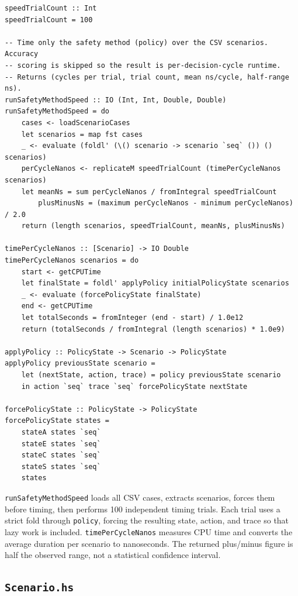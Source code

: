 \documentclass[11pt]{article}
\begin{document}
\begin{lstlisting}
speedTrialCount :: Int
speedTrialCount = 100

-- Time only the safety method (policy) over the CSV scenarios. Accuracy
-- scoring is skipped so the result is per-decision-cycle runtime.
-- Returns (cycles per trial, trial count, mean ns/cycle, half-range ns).
runSafetyMethodSpeed :: IO (Int, Int, Double, Double)
runSafetyMethodSpeed = do
    cases <- loadScenarioCases
    let scenarios = map fst cases
    _ <- evaluate (foldl' (\() scenario -> scenario `seq` ()) () scenarios)
    perCycleNanos <- replicateM speedTrialCount (timePerCycleNanos scenarios)
    let meanNs = sum perCycleNanos / fromIntegral speedTrialCount
        plusMinusNs = (maximum perCycleNanos - minimum perCycleNanos) / 2.0
    return (length scenarios, speedTrialCount, meanNs, plusMinusNs)

timePerCycleNanos :: [Scenario] -> IO Double
timePerCycleNanos scenarios = do
    start <- getCPUTime
    let finalState = foldl' applyPolicy initialPolicyState scenarios
    _ <- evaluate (forcePolicyState finalState)
    end <- getCPUTime
    let totalSeconds = fromInteger (end - start) / 1.0e12
    return (totalSeconds / fromIntegral (length scenarios) * 1.0e9)

applyPolicy :: PolicyState -> Scenario -> PolicyState
applyPolicy previousState scenario =
    let (nextState, action, trace) = policy previousState scenario
    in action `seq` trace `seq` forcePolicyState nextState

forcePolicyState :: PolicyState -> PolicyState
forcePolicyState states =
    stateA states `seq`
    stateE states `seq`
    stateC states `seq`
    stateS states `seq`
    states
\end{lstlisting}

\texttt{runSafetyMethodSpeed} loads all CSV cases, extracts scenarios, forces
them before timing, then performs 100 independent timing trials. Each trial
uses a strict fold through \texttt{policy}, forcing the resulting state,
action, and trace so that lazy work is included. \texttt{timePerCycleNanos}
measures CPU time and converts the average duration per scenario to
nanoseconds. The returned plus/minus figure is half the observed range, not a
statistical confidence interval.

\subsection{\texttt{Scenario.hs}}
\end{document}
